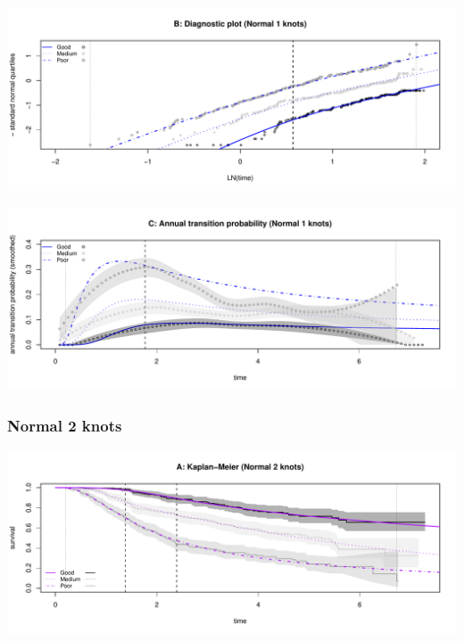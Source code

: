 \documentclass[
]{article}
\begin{document}
\begin{flushleft}\includegraphics[height=0.25\textheight]{BC_OS_output/Images/Figure_spline_models-20} \end{flushleft}

\begin{flushleft}\includegraphics[height=0.25\textheight]{BC_OS_output/Images/Figure_spline_models-21} \end{flushleft}

\clearpage

\subsubsection{Normal 2 knots}\label{normal-2-knots}

\begin{flushleft}\includegraphics[height=0.25\textheight]{BC_OS_output/Images/Figure_spline_models-22} \end{flushleft}
\end{document}

